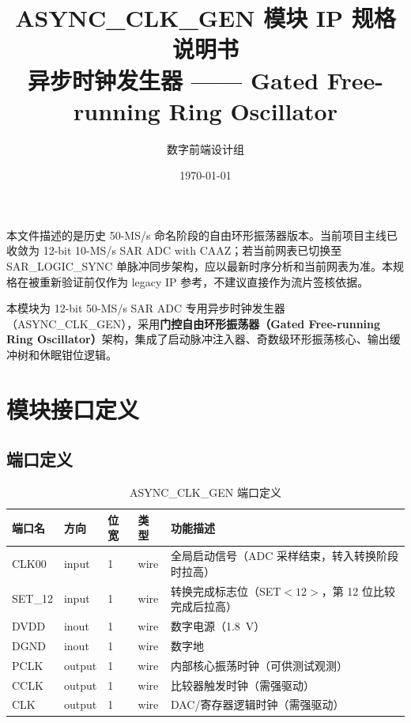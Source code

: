 \documentclass[11pt,a4paper,UTF8]{ctexart}
\title{\textbf{ASYNC\_CLK\_GEN 模块 IP 规格说明书}\\ \large 异步时钟发生器 —— Gated Free-running Ring Oscillator}
\author{数字前端设计组}
\date{\today}
\begin{document}
\maketitle

\begin{tcolorbox}[colback=orange!8!white,colframe=orange!75!black,title=\textbf{版本状态说明}]
本文件描述的是历史 50-MS/s 命名阶段的自由环形振荡器版本。当前项目主线已收敛为 12-bit 10-MS/s SAR ADC with CAAZ；若当前网表已切换至 SAR\_LOGIC\_SYNC 单脉冲同步架构，应以最新时序分析和当前网表为准。本规格在被重新验证前仅作为 legacy IP 参考，不建议直接作为流片签核依据。
\end{tcolorbox}

\begin{tcolorbox}[colback=blue!5!white,colframe=blue!75!black,title=\textbf{模块概述}]
本模块为 12-bit 50-MS/s SAR ADC 专用异步时钟发生器（ASYNC\_CLK\_GEN），采用\textbf{门控自由环形振荡器（Gated Free-running Ring Oscillator）}架构，集成了启动脉冲注入器、奇数级环形振荡核心、输出缓冲树和休眠钳位逻辑。
\end{tcolorbox}

\section{模块接口定义}

\subsection{端口定义}

\begin{table}[htbp]
\centering
\caption{ASYNC\_CLK\_GEN 端口定义}
\label{tab:ports}
\begin{tabular}{llllp{6cm}}
\toprule
\textbf{端口名} & \textbf{方向} & \textbf{位宽} & \textbf{类型} & \textbf{功能描述} \\
\midrule
CLK00 & input & 1 & wire & 全局启动信号（ADC 采样结束，转入转换阶段时拉高） \\
SET\_12 & input & 1 & wire & 转换完成标志位（SET$<12>$，第 12 位比较完成后拉高） \\
DVDD & inout & 1 & wire & 数字电源（\SI{1.8}{V}） \\
DGND & inout & 1 & wire & 数字地 \\
PCLK & output & 1 & wire & 内部核心振荡时钟（可供测试观测） \\
CCLK & output & 1 & wire & 比较器触发时钟（需强驱动） \\
CLK & output & 1 & wire & DAC/寄存器逻辑时钟（需强驱动） \\
\bottomrule
\end{tabular}
\end{table}
\end{document}

